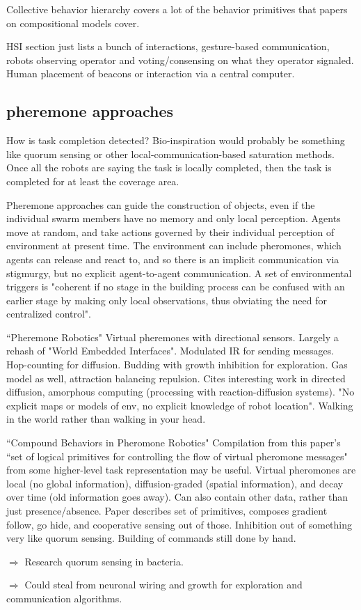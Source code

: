 \documentclass[]{article}
\begin{document}
Collective behavior hierarchy covers a lot of the behavior primitives that papers on compositional models cover. 

HSI section just lists a bunch of interactions, gesture-based communication, robots observing operator and voting/consensing on what they operator signaled. Human placement of beacons or interaction via a central computer.

\subsection{pheremone approaches}

How is task completion detected? Bio-inspiration would probably be something like quorum sensing or other local-communication-based saturation methods. Once all the robots are saying the task is locally completed, then the task is completed for at least the coverage area. 

Pheremone approaches can guide the construction of objects, even if the individual swarm members have no memory and only local perception\cite{mason2003programming}. 
Agents move at random, and take actions governed by their individual perception of environment at present time. 
The environment can include pheromones, which agents can release and react to, and so there is an implicit communication via stigmurgy, but no explicit agent-to-agent communication. 
A set of environmental triggers is "coherent if no stage in the building process can be confused with an earlier stage by making only local observations, thus obviating the need for centralized control".   

``Pheremone Robotics" \cite{payton2001pheromone} Virtual pheremones with directional sensors. Largely a rehash of "World Embedded Interfaces". Modulated IR for sending messages. Hop-counting for diffusion. Budding with growth inhibition for exploration. Gas model as well, attraction balancing repulsion. Cites interesting work in directed diffusion, amorphous computing (processing with reaction-diffusion systems). "No explicit maps or models of env, no explicit knowledge of robot location". Walking in the world rather than walking in your head. 

``Compound Behaviors in Pheromone Robotics" \cite{payton2003compound} Compilation from this paper's ``set of logical primitives for controlling the flow of virtual pheromone messages" from some higher-level task representation may be useful. Virtual pheromones are local (no global information), diffusion-graded (spatial information), and decay over time (old information goes away). Can also contain other data, rather than just presence/absence. Paper describes set of primitives, composes gradient follow, go hide, and cooperative sensing out of those. Inhibition out of something very like quorum sensing. Building of commands still done by hand. 

$\Rightarrow$ Research quorum sensing in bacteria.

$\Rightarrow$ Could steal from neuronal wiring and growth for exploration and communication algorithms. 





\end{document}
